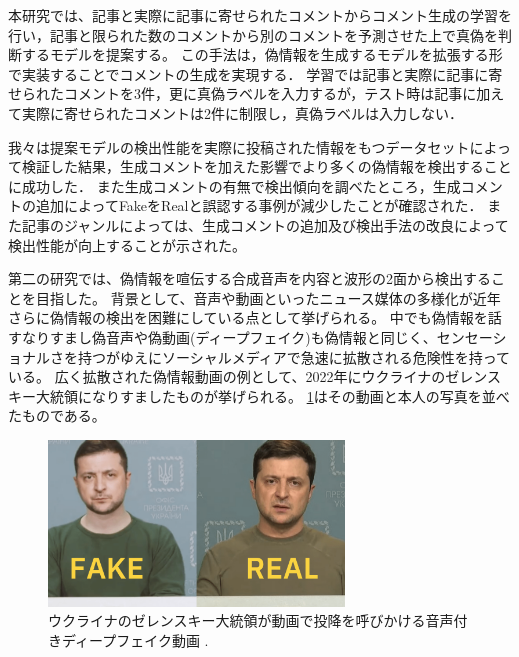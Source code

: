 本研究では、記事と実際に記事に寄せられたコメントからコメント生成の学習を行い，記事と限られた数のコメントから別のコメントを予測させた上で真偽を判断するモデルを提案する。
この手法は，偽情報を生成するモデル\cite{DBLP:journals/corr/abs-1905-12616}を拡張する形で実装することでコメントの生成を実現する．
学習では記事と実際に記事に寄せられたコメントを3件，更に真偽ラベルを入力するが，テスト時は記事に加えて実際に寄せられたコメントは2件に制限し，真偽ラベルは入力しない．

我々は提案モデルの検出性能を実際に投稿された情報をもつデータセットによって検証した結果，生成コメントを加えた影響でより多くの偽情報を検出することに成功した．
また生成コメントの有無で検出傾向を調べたところ，生成コメントの追加によってFakeをRealと誤認する事例が減少したことが確認された．
また記事のジャンルによっては、生成コメントの追加及び検出手法の改良によって検出性能が向上することが示された。

第二の研究では、偽情報を喧伝する合成音声を内容と波形の2面から検出することを目指した。
背景として、音声や動画といったニュース媒体の多様化が近年さらに偽情報の検出を困難にしている点として挙げられる。
中でも偽情報を話すなりすまし偽音声や偽動画(ディープフェイク)も偽情報と同じく、センセーショナルさを持つがゆえにソーシャルメディアで急速に拡散される危険性を持っている。
広く拡散された偽情報動画の例として、2022年にウクライナのゼレンスキー大統領になりすましたものが挙げられる。
\cref{fig:zelensky}はその動画と本人の写真を並べたものである。

\begin{figure}[h]  %
    \centering
    \includegraphics[width=0.7\textwidth]{figures/zelensky.png}
    \caption{ウクライナのゼレンスキー大統領が動画で投降を呼びかける音声付きディープフェイク動画 \cite{evon_2022}.}
    \label{fig:zelensky}
\end{figure}

